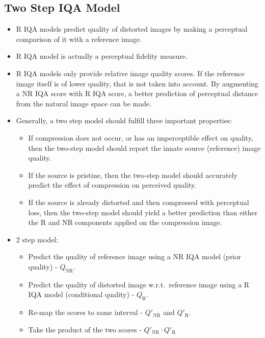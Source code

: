 \documentclass{article}
\begin{document}
    \subsection{Two Step IQA Model}\label{subsec:Predicting_the_Quality_of_Images_Compressed_After_Distortion_in_Two_Steps:two-step-iqa-model}
    \begin{itemize}
        \item R IQA models predict quality of distorted images by making a perceptual comparison of it with a reference image.
        \item R IQA model is actually a perceptual fidelity measure.
        \item R IQA models only provide relative image quality scores.
        If the reference image itself is of lower quality, that is not taken into account.
        By augmenting a NR IQA score with R IQA score, a better prediction of perceptual distance from the natural image space can be made.
        \item Generally, a two step model should fulfill three important properties:
        \begin{itemize}
            \item If compression does not occur, or has an imperceptible effect on quality, then the two-step model should report the innate source (reference) image quality.
            \item If the source is pristine, then the two-step model should accurately predict the effect of compression on perceived quality.
            \item If the source is already distorted and then compressed with perceptual loss, then the two-step model should yield a better prediction than either the R and NR components applied on the compression image.
        \end{itemize}
        \item 2 step model:
        \begin{itemize}
            \item Predict the quality of reference image using a NR IQA model (prior quality) - $Q_{\textrm{NR}}$.
            \item Predict the quality of distorted image w.r.t.\ reference image using a R IQA model (conditional quality) - $Q_{\textrm{R}}$.
            \item Re-map the scores to same interval - $Q'_{\textrm{NR}}$ and $Q'_{\textrm{R}}$.
            \item Take the product of the two scores - $Q'_{\textrm{NR}} \cdot Q'_{\textrm{R}}$

\end{itemize}
\end{itemize}
\end{document}
